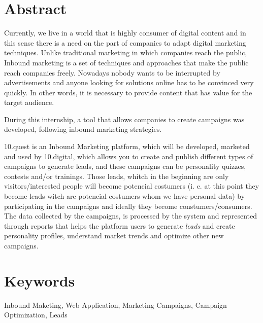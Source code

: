 \section*{Abstract}
\label{sec:abstract}


Currently, we live in a world that is highly consumer of digital content and in this sense there is a need on the part of companies to adapt digital marketing techniques. Unlike traditional marketing in which companies reach the public, Inbound marketing is a set of techniques and approaches that make the public reach companies freely. Nowadays nobody wants to be interrupted by advertisements and anyone looking for solutions online has to be convinced very quickly. In other words, it is necessary to provide content that has value for the target audience.

During this internship, a tool that allows companies to create campaigns was developed, following inbound marketing strategies.

10.quest is an Inbound Marketing platform, which will be developed, marketed and used by 10.digital, which allows you to create and publish different types of campaigns to generate leads, and these campaigns can be personality quizzes, contests and/or trainings. Those leads, whitch in the beginning are only visitors/interested people will become potencial costumers (i. e. at this point they become leads witch are potencial costumers whom we have personal data) by participating in the campaigns and ideally they become constumers/consumers. The data collected by the campaigns, is processed by the system and represented through reports that helps the platform users to generate \textit {leads} and create personality profiles, understand market trends and optimize other new campaigns.



\section*{Keywords}
\label{sec:keywords}

Inbound Maketing, Web Application, Marketing Campaigns, Campaign Optimization, Leads 
